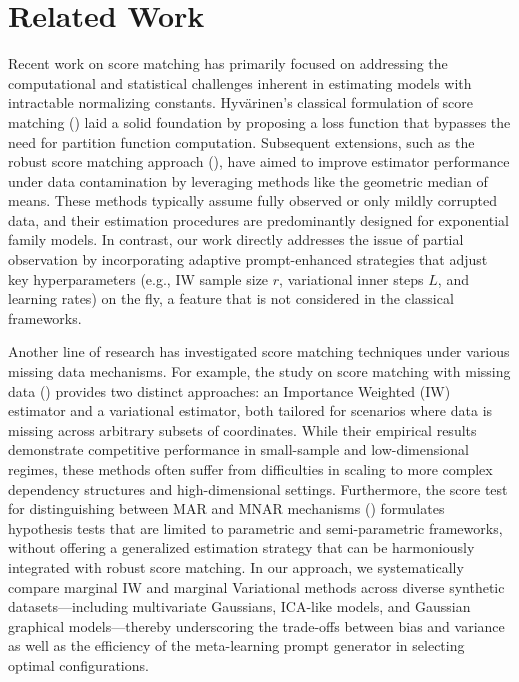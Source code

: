 \documentclass{article} %
\begin{document}
\section{Related Work}
Recent work on score matching has primarily focused on addressing the computational and statistical challenges inherent in estimating models with intractable normalizing constants. Hyv\"arinen's classical formulation of score matching (\cite{lin2016estimation}) laid a solid foundation by proposing a loss function that bypasses the need for partition function computation. Subsequent extensions, such as the robust score matching approach (\cite{schwank2025robust}), have aimed to improve estimator performance under data contamination by leveraging methods like the geometric median of means. These methods typically assume fully observed or only mildly corrupted data, and their estimation procedures are predominantly designed for exponential family models. In contrast, our work directly addresses the issue of partial observation by incorporating adaptive prompt-enhanced strategies that adjust key hyperparameters (e.g., IW sample size $r$, variational inner steps $L$, and learning rates) on the fly, a feature that is not considered in the classical frameworks.

Another line of research has investigated score matching techniques under various missing data mechanisms. For example, the study on score matching with missing data (\cite{givens2025score}) provides two distinct approaches: an Importance Weighted (IW) estimator and a variational estimator, both tailored for scenarios where data is missing across arbitrary subsets of coordinates. While their empirical results demonstrate competitive performance in small-sample and low-dimensional regimes, these methods often suffer from difficulties in scaling to more complex dependency structures and high-dimensional settings. Furthermore, the score test for distinguishing between MAR and MNAR mechanisms (\cite{wang2021score}) formulates hypothesis tests that are limited to parametric and semi-parametric frameworks, without offering a generalized estimation strategy that can be harmoniously integrated with robust score matching. In our approach, we systematically compare marginal IW and marginal Variational methods across diverse synthetic datasets—including multivariate Gaussians, ICA-like models, and Gaussian graphical models—thereby underscoring the trade-offs between bias and variance as well as the efficiency of the meta-learning prompt generator in selecting optimal configurations.
\end{document}
